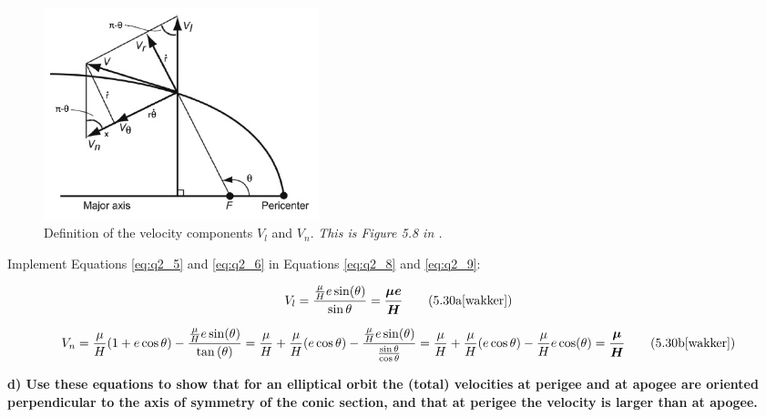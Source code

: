 \begin{figure}[ht]
    \centering
    \includegraphics[width=8cm]{img/q2c.jpg}
    \caption{Definition of the velocity components $V_{l}$ and $V_{n}$. \textit{This is Figure 5.8 in \cite{wakker}.}}
    \label{fig:q2c}
\end{figure}

\noindent Implement Equations \ref{eq:q2_5} and \ref{eq:q2_6} in Equations \ref{eq:q2_8} and \ref{eq:q2_9}:

\begin{equation}
    V_{l} = \frac{\frac{\mu}{H} e\sin(\theta)}{\sin{\theta}} = \boldsymbol{\frac{\mu e}{H}}
    \tag{5.30a\cite{wakker}}
    \label{eq:q2_10}
\end{equation}

\begin{equation}
    V_{n} = \frac{\mu}{H}(1 + e\cos{\theta}) - \frac{\frac{\mu}{H} e\sin(\theta)}{\tan{(\theta)}} = \frac{\mu}{H} + \frac{\mu}{H}(e\cos{\theta}) - \frac{\frac{\mu}{H} e\sin(\theta)}{\frac{\sin{\theta}}{\cos{\theta}}} = \frac{\mu}{H} + \frac{\mu}{H}(e\cos{\theta}) - \frac{\mu}{H}e\cos(\theta) = \boldsymbol{\frac{\mu}{H}}
    \tag{5.30b\cite{wakker}}
    \label{eq:q2_11}
\end{equation}










\noindent \textbf{d) Use these equations to show that for an elliptical orbit the (total) velocities at perigee and at apogee are oriented perpendicular to the axis of symmetry of the conic section, and that at perigee the velocity is larger than at apogee.}

